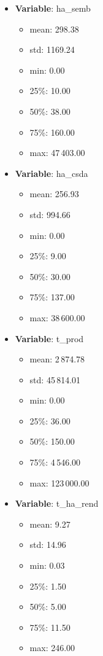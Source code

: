 \documentclass[12pt,a4paper]{article}
\begin{document}
\begin{center}
    \begin{itemize}
        \item \textbf{Variable}: ha\_semb
        \begin{itemize}
            \item mean: 298.38
            \item std: 1169.24
            \item min: 0.00
            \item 25\%: 10.00
            \item 50\%: 38.00
            \item 75\%: 160.00
            \item max: 47\,403.00
        \end{itemize}

        \item \textbf{Variable}: ha\_csda
        \begin{itemize}
            \item mean: 256.93
            \item std: 994.66
            \item min: 0.00
            \item 25\%: 9.00
            \item 50\%: 30.00
            \item 75\%: 137.00
            \item max: 38\,600.00
        \end{itemize}

        \item \textbf{Variable}: t\_prod
        \begin{itemize}
            \item mean: 2\,874.78
            \item std: 45\,814.01
            \item min: 0.00
            \item 25\%: 36.00
            \item 50\%: 150.00
            \item 75\%: 4\,546.00
            \item max: 123\,000.00
        \end{itemize}

        \item \textbf{Variable}: t\_ha\_rend
        \begin{itemize}
            \item mean: 9.27
            \item std: 14.96
            \item min: 0.03
            \item 25\%: 1.50
            \item 50\%: 5.00
            \item 75\%: 11.50
            \item max: 246.00
        \end{itemize}
    \end{itemize}
\end{center}
\end{document}
